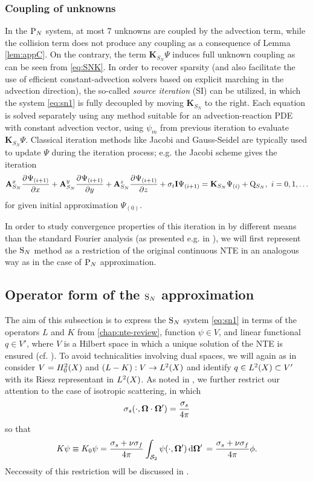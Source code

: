 \subsubsection{Coupling of unknowns}
In the $\PN$ system, at most 7 unknowns are coupled by the advection term, while the collision term does not produce
any coupling as a consequence of Lemma \ref{lem:appC}. On the contrary, the term
$\mathbf{K}_{S_N}\Psi$ induces full unknown coupling as can be seen from \eqref{eq:SNK}.
In order to recover sparsity (and also facilitate the use of efficient constant-advection solvers based on explicit marching in the
advection  direction), the so-called  \textit{source iteration} (SI)  can be utilized,
in which the system \eqref{eq:sn1} is fully decoupled by moving $\mathbf{K}_{S_N}$ to the right. Each equation is solved separately using any method suitable for an advection-reaction PDE with constant
advection vector, using $\psi_m$ from previous iteration to evaluate $\mathbf{K}_{S_N}\Psi$. Classical iteration methods
like Jacobi and Gauss-Seidel are typically used to update $\Psi$ during the iteration process; e.g. the Jacobi scheme 
gives the iteration
\begin{equation}\label{eq:SI}
	\mat{A}_{S_N}^x\pd{\Psi_{(i+1)}}{x} + \mat{A}_{S_N}^y\pd{\Psi_{(i+1)}}{y} +
	\mat{A}_{S_N}^z\pd{\Psi_{(i+1)}}{z} + \sigma_t\mat{I}\Psi_{(i+1)}= \mathbf{K}_{S_N}\Psi_{(i)} +
	\mathrm{Q}_{S_N},\ 
	i = 0,1,\ldots
\end{equation}
for given initial approximation $\Psi_{(0)}$. 

In order to study convergence properties of this iteration in  by different means than the standard
Fourier analysis (as presented e.g. in \cite[Chap. III]{Adams}), we will first represent the $\SN$ method as a
restriction of the original continuous NTE in an analogous way as in the case of $\PN$ approximation.










\subsection{Operator form of the $\SN$ approximation}\label{sec:operator_sn}
The aim of this subsection is to express the $\SN$ system
\eqref{eq:sn1} in terms of the operators $L$ and $K$ from \cref{chap:nte-review}, function $\psi\in V$, and linear
functional $q\in V'$, where $V$ is a Hilbert space in which a unique solution of the NTE is ensured
(cf. \sref{sec:fixed-source}). To avoid technicalities involving dual spaces, we will again as in  consider
\mbox{$V = \Hpnot[2](X)$} and $(L - K): V \to \Lp[2](X) $ and identify $q \in \Lp[2](X) \subset V'$ with its Riesz
representant in $\Lp[2](X)$.
As noted in , we further restrict our attention to the case of isotropic scattering, in which $$
\sigma_s(\cdot,\bomega\cdot\bomega') = \frac{\sigma_s}{4\pi} $$ so that
$$
	K\psi \equiv K_0\psi = \frac{\sigma_s + \nu\sigma_f}{4\pi}\intA[']{\psi(\cdot,\bomega')} = \frac{\sigma_s +
	\nu\sigma_f}{4\pi}\phi.
$$
Neccessity of this restriction will be discussed in .


